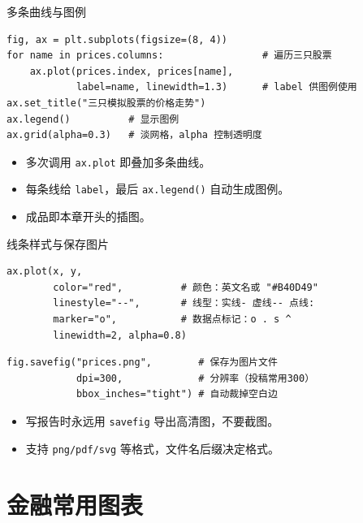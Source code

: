 \documentclass[9pt]{ctexbeamer}
\begin{document}
\begin{frame}[fragile]{多条曲线与图例}
	\begin{lstlisting}
fig, ax = plt.subplots(figsize=(8, 4))
for name in prices.columns:                 # 遍历三只股票
    ax.plot(prices.index, prices[name],
            label=name, linewidth=1.3)      # label 供图例使用
ax.set_title("三只模拟股票的价格走势")
ax.legend()          # 显示图例
ax.grid(alpha=0.3)   # 淡网格，alpha 控制透明度
\end{lstlisting}
	\begin{itemize}
		\item 多次调用 \texttt{ax.plot} 即叠加多条曲线。
		\item 每条线给 \texttt{label}，最后 \texttt{ax.legend()} 自动生成图例。
		\item 成品即本章开头的插图。
	\end{itemize}
\end{frame}

\begin{frame}[fragile]{线条样式与保存图片}
	\begin{lstlisting}
ax.plot(x, y,
        color="red",          # 颜色：英文名或 "#B40D49"
        linestyle="--",       # 线型：实线- 虚线-- 点线:
        marker="o",           # 数据点标记：o . s ^
        linewidth=2, alpha=0.8)
\end{lstlisting}
	\begin{lstlisting}
fig.savefig("prices.png",        # 保存为图片文件
            dpi=300,             # 分辨率（投稿常用300）
            bbox_inches="tight") # 自动裁掉空白边
\end{lstlisting}
	\begin{itemize}
		\item 写报告时\alert{永远用 \texttt{savefig} 导出高清图}，不要截图。
		\item 支持 \texttt{png/pdf/svg} 等格式，文件名后缀决定格式。
	\end{itemize}
\end{frame}


\section{金融常用图表}
\end{document}
